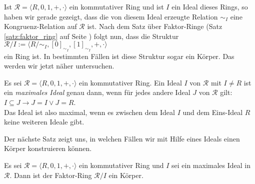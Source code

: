 Ist $\mathcal{R} = \langle R, 0, 1, +, \cdot \rangle$ ein kommutativer Ring und ist $I$ ein
Ideal dieses Rings, so haben wir gerade gezeigt, dass die von diesem Ideal erzeugte Relation $\sim_I$
eine Kongruenz-Relation auf $\mathcal{R}$ ist.  Nach dem Satz \"{u}ber Faktor-Ringe
(Satz \ref{satz:faktor_ring} auf Seite \pageref{satz:faktor_ring}) folgt nun, dass die Struktur
\\[0.2cm]
\hspace*{1.3cm}
 $\mathcal{R}/I := \langle R/\!\sim_I, [0]_{\sim_I}, [1]_{\sim_I}, +, \cdot \rangle$
\\[0.2cm]
ein Ring ist.  In bestimmten F\"{a}llen ist diese Struktur sogar ein K\"{o}rper.  Das werden wir jetzt n\"{a}her
untersuchen.

\begin{Definition}
  Es sei $\mathcal{R} = \langle R, 0, 1, +, \cdot \rangle$ ein kommutativer Ring.  Ein Ideal
  $I$ von $\mathcal{R}$ mit $I \not= R$ ist ein {\color{blue}\emph{maximales Ideal}} genau dann, wenn f\"{u}r jedes andere Ideal
  $J$ von $\mathcal{R}$ gilt:
  \\[0.2cm]
  \hspace*{1.3cm}
  $I \subseteq J \rightarrow J = I \vee J = R$.
  \\[0.2cm]
  Das Ideal ist also maximal, wenn es zwischen dem Ideal $I$ und dem Eins-Ideal $R$ keine 
  weiteren Ideale gibt.
  \eoxs
\end{Definition}

Der n\"{a}chste Satz zeigt uns, in welchen F\"{a}llen wir mit Hilfe eines Ideals einen K\"{o}rper konstruieren
k\"{o}nnen. 
\begin{Satz} 
  Es sei $\mathcal{R} = \langle R, 0, 1, +, \cdot \rangle$ ein kommutativer Ring und
  $I$ sei ein maximales Ideal in $\mathcal{R}$.  Dann ist der Faktor-Ring
  $\mathcal{R}/I$ ein K\"{o}rper.
\end{Satz}

